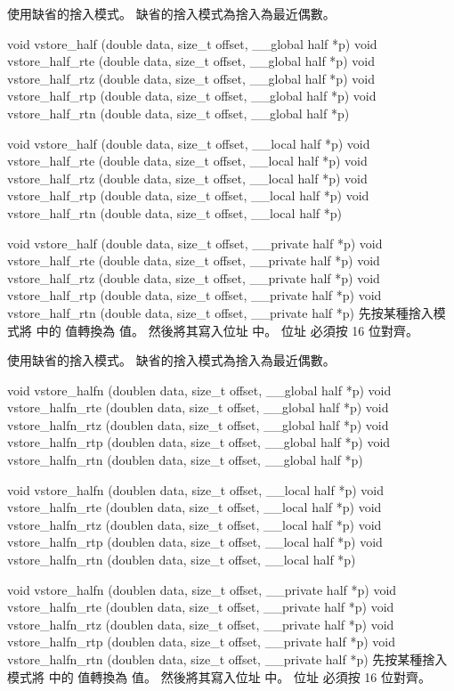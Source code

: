  使用缺省的捨入模式。
缺省的捨入模式為捨入為最近偶數。
\stopbuffer

void vstore_half (double data,
	size_t offset,
	__global half *p)
void vstore_half_rte (double data,
	size_t offset,
	__global half *p)
void vstore_half_rtz (double data,
	size_t offset,
	__global half *p)
void vstore_half_rtp (double data,
	size_t offset,
	__global half *p)
void vstore_half_rtn (double data,
	size_t offset,
	__global half *p)

void vstore_half (double data,
	size_t offset,
	__local half *p)
void vstore_half_rte (double data,
	size_t offset,
	__local half *p)
void vstore_half_rtz (double data,
	size_t offset,
	__local half *p)
void vstore_half_rtp (double data,
	size_t offset,
	__local half *p)
void vstore_half_rtn (double data,
	size_t offset,
	__local half *p)

void vstore_half (double data,
	size_t offset,
	__private half *p)
void vstore_half_rte (double data,
	size_t offset,
	__private half *p)
void vstore_half_rtz (double data,
	size_t offset,
	__private half *p)
void vstore_half_rtp (double data,
	size_t offset,
	__private half *p)
void vstore_half_rtn (double data,
	size_t offset,
	__private half *p)
\stopbuffer
{}
先按某種捨入模式將  中的  值轉換為  值。
然後將其寫入位址  中。
位址  必須按 16 位對齊。

 使用缺省的捨入模式。
缺省的捨入模式為捨入為最近偶數。
\stopbuffer

void vstore_halfn (doublen data,
	size_t offset,
	__global half *p)
void vstore_halfn_rte (doublen data,
	size_t offset,
	__global half *p)
void vstore_halfn_rtz (doublen data,
	size_t offset,
	__global half *p)
void vstore_halfn_rtp (doublen data,
	size_t offset,
	__global half *p)
void vstore_halfn_rtn (doublen data,
	size_t offset,
	__global half *p)

void vstore_halfn (doublen data,
	size_t offset,
	__local half *p)
void vstore_halfn_rte (doublen data,
	size_t offset,
	__local half *p)
void vstore_halfn_rtz (doublen data,
	size_t offset,
	__local half *p)
void vstore_halfn_rtp (doublen data,
	size_t offset,
	__local half *p)
void vstore_halfn_rtn (doublen data,
	size_t offset,
	__local half *p)

void vstore_halfn (doublen data,
	size_t offset,
	__private half *p)
void vstore_halfn_rte (doublen data,
	size_t offset,
	__private half *p)
void vstore_halfn_rtz (doublen data,
	size_t offset,
	__private half *p)
void vstore_halfn_rtp (doublen data,
	size_t offset,
	__private half *p)
void vstore_halfn_rtn (doublen data,
	size_t offset,
	__private half *p)
\stopbuffer
{}
先按某種捨入模式將  中的  值轉換為  值。
然後將其寫入位址  中。
位址  必須按 16 位對齊。

